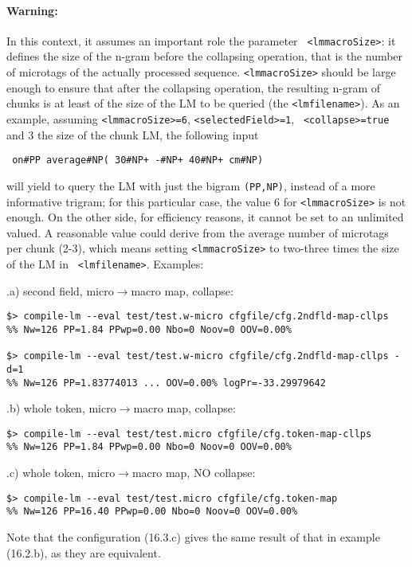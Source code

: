 \documentclass[11pt]{article}
\begin{document}
\paragraph{Warning:} In this context, it assumes an important role the parameter {\tt
<lmmacroSize>}: it defines the size of the n-gram before the collapsing
operation, that is the number of microtags of the actually processed
sequence. {\tt <lmmacroSize>} should be large enough to ensure that after
the collapsing operation, the resulting n-gram of chunks is at least of the
size of the LM to be queried (the {\tt <lmfilename>}). As an example,
assuming {\tt <lmmacroSize>=6}, {\tt <selectedField>=1}, {\tt
<collapse>=true} and 3 the size of the chunk LM, the following input

\begin{verbatim}
 on#PP average#NP( 30#NP+ -#NP+ 40#NP+ cm#NP)
\end{verbatim}

\noindent will yield to query the LM with just the bigram {\tt (PP,NP)},
instead of a more informative trigram; for this particular case, the value
6 for {\tt <lmmacroSize>} is not enough.  On the other side, for efficiency
reasons, it cannot be set to an unlimited valued. A reasonable value could
derive from the average number of microtags per chunk (2-3), which means
setting {\tt <lmmacroSize>} to two-three times the size of the LM in {\tt
<lmfilename>}.  Examples:
\bigskip

\noindent \thesubsection.a) second field, micro$\rightarrow$macro map, collapse:
\begin{verbatim}
$> compile-lm --eval test/test.w-micro cfgfile/cfg.2ndfld-map-cllps
%% Nw=126 PP=1.84 PPwp=0.00 Nbo=0 Noov=0 OOV=0.00%

$> compile-lm --eval test/test.w-micro cfgfile/cfg.2ndfld-map-cllps -d=1
%% Nw=126 PP=1.83774013 ... OOV=0.00% logPr=-33.29979642

\end{verbatim}

\noindent
\thesubsection.b) whole token,  micro$\rightarrow$macro map, collapse:
\begin{verbatim}
$> compile-lm --eval test/test.micro cfgfile/cfg.token-map-cllps
%% Nw=126 PP=1.84 PPwp=0.00 Nbo=0 Noov=0 OOV=0.00%
\end{verbatim}

\noindent
\thesubsection.c)  whole token,  micro$\rightarrow$macro map, NO collapse:
\begin{verbatim}
$> compile-lm --eval test/test.micro cfgfile/cfg.token-map
%% Nw=126 PP=16.40 PPwp=0.00 Nbo=0 Noov=0 OOV=0.00%
\end{verbatim}
\noindent Note that the configuration (16.3.c) gives the same result of that in
example (16.2.b), as they are equivalent.
\end{document}
